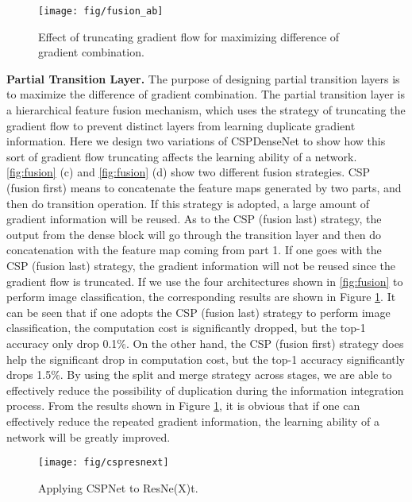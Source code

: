 \documentclass{article}
\begin{document}
\begin{figure}[h]
	\begin{center}
		\texttt{[image: fig/fusion\_ab]}
	\end{center}
	\caption{Effect of truncating gradient flow for maximizing difference of gradient combination.  }
	\label{fig:fusion_ab}
\end{figure}

{\bf Partial Transition Layer.} The purpose of designing partial transition layers is to maximize the difference of gradient combination.  The partial transition layer is a hierarchical feature fusion mechanism, which uses the strategy of truncating the gradient flow to prevent distinct layers from learning duplicate gradient information.  Here we design two variations of CSPDenseNet to show how this sort of gradient flow truncating affects the learning ability of a network.  \ref{fig:fusion} (c) and \ref{fig:fusion} (d) show two different fusion strategies.  CSP (fusion first) means to concatenate the feature maps generated by two parts, and then do transition operation.  If this strategy is adopted, a large amount of gradient information will be reused.  As to the CSP (fusion last) strategy, the output from the dense block will go through the transition layer and then do concatenation with the feature map coming from part 1.  If one goes with the CSP (fusion last) strategy, the gradient information will not be reused since the gradient flow is truncated.  If we use the four architectures shown in \ref{fig:fusion} to perform image classification, the corresponding results are shown in Figure \ref{fig:fusion_ab}.  It can be seen that if one adopts the CSP (fusion last) strategy to perform image classification, the computation cost is significantly dropped, but the top-1 accuracy only drop 0.1\%.  On the other hand, the CSP (fusion first) strategy does help the significant drop in computation cost, but the top-1 accuracy significantly drops 1.5\%.  By using the split and merge strategy across stages, we are able to effectively reduce the possibility of duplication during the information integration process.  From the results shown in Figure \ref{fig:fusion_ab}, it is obvious that if one can effectively reduce the repeated gradient information, the learning ability of a network will be greatly improved.

\begin{figure}[h]
	\begin{center}
		\texttt{[image: fig/cspresnext]}
	\end{center}
	\caption{Applying CSPNet to ResNe(X)t.  }
	\label{fig:cspresnext}
\end{figure}
\end{document}
